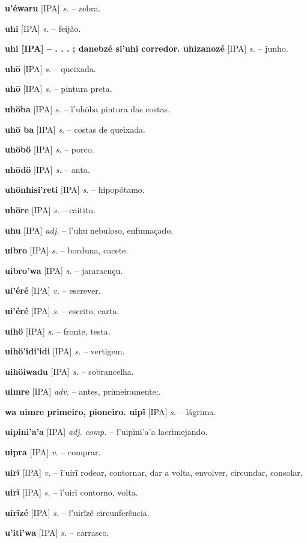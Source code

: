 \textbf{u'éwaru} [IPA] \textit{s.} -- zebra.

\textbf{uhi} [IPA] \textit{s.} -- feijão.

\textbf{uhi [IPA]  -- . . . ; danebzé si'uhi corredor. uhizanozé} [IPA] \textit{s.} -- junho.

\textbf{uhö} [IPA] \textit{s.} -- queixada.

\textbf{uhö} [IPA] \textit{s.} -- pintura preta.

\textbf{uhöba} [IPA] \textit{s.} -- ĩ'uhöba pintura das costas.

\textbf{uhö ba} [IPA] \textit{s.} -- costas de queixada.

\textbf{uhöbö} [IPA] \textit{s.} -- porco.

\textbf{uhödö} [IPA] \textit{s.} -- anta.

\textbf{uhönhisi'reti} [IPA] \textit{s.} -- hipopótamo.

\textbf{uhöre} [IPA] \textit{s.} -- caititu.

\textbf{uhu} [IPA] \textit{adj.} -- ĩ'uhu nebuloso, enfumaçado.

\textbf{uibro} [IPA] \textit{s.} -- borduna, cacete.

\textbf{uibro'wa} [IPA] \textit{s.} -- jararacuçu.

\textbf{ui'éré} [IPA] \textit{v.} -- escrever.

\textbf{ui'éré} [IPA] \textit{s.} -- escrito, carta.

\textbf{uihö} [IPA] \textit{s.} -- fronte, testa.

\textbf{uihö'idi'idi} [IPA] \textit{s.} -- vertigem.

\textbf{uihöiwadu} [IPA] \textit{s.} -- sobrancelha.

\textbf{uimre} [IPA] \textit{adv.} -- antes, primeiramente;.

\textbf{wa uimre primeiro, pioneiro. uipĩ} [IPA] \textit{s.} -- lágrima.

\textbf{uipini'a'a} [IPA] \textit{adj. comp.} -- ĩ'uipini'a'a lacrimejando.

\textbf{uipra} [IPA] \textit{v.} -- comprar.

\textbf{uirĩ} [IPA] \textit{v.} -- ĩ'uirĩ rodear, contornar, dar a volta, envolver, circundar, consolar.

\textbf{uirĩ} [IPA] \textit{s.} -- ĩ'uirĩ contorno, volta.

\textbf{uirĩzé} [IPA] \textit{s.} -- ĩ'uirĩzé circunferência.

\textbf{u'iti'wa} [IPA] \textit{s.} -- carrasco.

